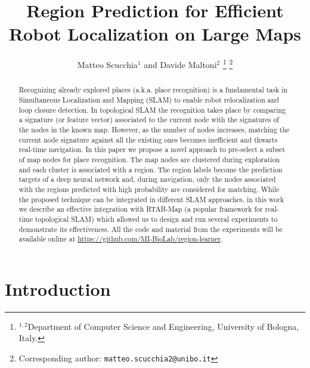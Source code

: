 \documentclass[letterpaper, 10 pt, conference]{ieeeconf}  %
\title{\LARGE \bf
Region Prediction for Efficient Robot Localization on Large Maps
}
\author{Matteo Scucchia$^{1}$ and Davide Maltoni$^{2}$%
\thanks{$^{1, 2}$Department of Computer Science and Engineering, University of Bologna, Italy.}%
\thanks{Corresponding author:  {\tt\small matteo.scucchia2@unibo.it}}
}
\begin{document}
\maketitle
\thispagestyle{empty}
\pagestyle{empty}


\begin{abstract}

Recognizing already explored places (a.k.a. place recognition) is a fundamental task in Simultaneous Localization and Mapping (SLAM) to enable robot relocalization and loop closure detection. In topological SLAM the recognition takes place by comparing a signature (or feature vector) associated to the current node with the signatures of the nodes in the known map. However, as the number of nodes increases, matching the current node signature against all the existing ones becomes inefficient and thwarts real-time navigation. In this paper we propose a novel approach to pre-select a subset of map nodes for place recognition. The map nodes are clustered during exploration and each cluster is associated with a region. The region labels become the prediction targets of a deep neural network and, during navigation, only the nodes associated with the regions predicted with high probability are considered for matching. While the proposed technique can be integrated in different SLAM approaches, in this work we describe an effective integration with RTAB-Map (a popular framework for real-time topological SLAM) which allowed us to design and run several experiments to demonstrate its effectiveness. All the code and material from the experiments will be available online at \href{https://github.com/MI-BioLab/region-learner}{https://github.com/MI-BioLab/region-learner}.


\end{abstract}


\section{Introduction}  \label{introduction}
\end{document}
